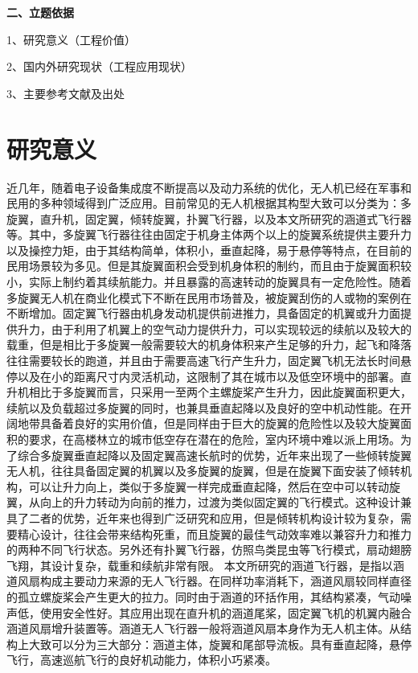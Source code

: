 \textbf{\fangsong\xiaosihao 二、立题依据}
\vspace{-0.30cm}
\begin{ubox}
	\setlength{\parindent}{0em} 
1、研究意义（工程价值）
\vspace{-0.25cm}

2、国内外研究现状（工程应用现状）
\vspace{-0.25cm}

3、主要参考文献及出处
\setlength{\parindent}{2em} 
\section{研究意义}
近几年，随着电子设备集成度不断提高以及动力系统的优化，无人机已经在军事和民用的多种领域得到广泛应用。目前常见的无人机根据其构型大致可以分类为：多旋翼，直升机，固定翼，倾转旋翼，扑翼飞行器，以及本文所研究的涵道式飞行器等。其中，多旋翼飞行器往往由固定于机身主体两个以上的旋翼系统提供主要升力以及操控力矩，由于其结构简单，体积小，垂直起降，易于悬停等特点，在目前的民用场景较为多见。但是其旋翼面积会受到机身体积的制约，而且由于旋翼面积较小，实际上制约着其续航能力。并且暴露的高速转动的旋翼具有一定危险性。随着多旋翼无人机在商业化模式下不断在民用市场普及，被旋翼刮伤的人或物的案例在不断增加。固定翼飞行器由机身发动机提供前进推力，具备固定的机翼或升力面提供升力，由于利用了机翼上的空气动力提供升力，可以实现较远的续航以及较大的载重，但是相比于多旋翼一般需要较大的机身体积来产生足够的升力，起飞和降落往往需要较长的跑道，并且由于需要高速飞行产生升力，固定翼飞机无法长时间悬停以及在小的距离尺寸内灵活机动，这限制了其在城市以及低空环境中的部署。直升机相比于多旋翼而言，只采用一至两个主螺旋桨产生升力，因此旋翼面积更大，续航以及负载超过多旋翼的同时，也兼具垂直起降以及良好的空中机动性能。在开阔地带具备着良好的实用价值，但是同样由于巨大的旋翼的危险性以及较大旋翼面积的要求，在高楼林立的城市低空存在潜在的危险，室内环境中难以派上用场。为了综合多旋翼垂直起降以及固定翼高速长航时的优势，近年来出现了一些倾转旋翼无人机，往往具备固定翼的机翼以及多旋翼的旋翼，但是在旋翼下面安装了倾转机构，可以让升力向上，类似于多旋翼一样完成垂直起降，然后在空中可以转动旋翼，从向上的升力转动为向前的推力，过渡为类似固定翼的飞行模式。这种设计兼具了二者的优势，近年来也得到广泛研究和应用，但是倾转机构设计较为复杂，需要精心设计，往往会带来结构死重，而且旋翼的最佳气动效率难以兼容升力和推力的两种不同飞行状态。另外还有扑翼飞行器，仿照鸟类昆虫等飞行模式，扇动翅膀飞翔，其设计复杂，载重和续航非常有限。
本文所研究的涵道飞行器，是指以涵道风扇构成主要动力来源的无人飞行器。在同样功率消耗下，涵道风扇较同样直径的孤立螺旋桨会产生更大的拉力。同时由于涵道的环括作用，其结构紧凑，气动噪声低，使用安全性好。其应用出现在直升机的涵道尾桨，固定翼飞机的机翼内融合涵道风扇增升装置等。涵道无人飞行器一般将涵道风扇本身作为无人机主体。从结构上大致可以分为三大部分：涵道主体，旋翼和尾部导流板。具有垂直起降，悬停飞行，高速巡航飞行的良好机动能力，体积小巧紧凑。


\end{ubox}
